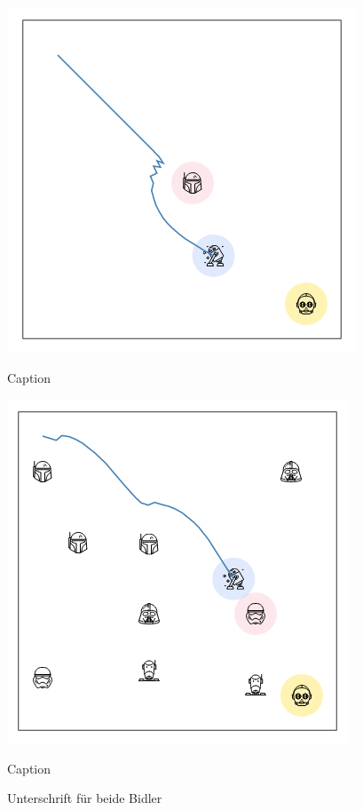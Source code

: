 \begin{figure}
\centering
\begin{minipage}[b]{.48\textwidth}
\centering
\includegraphics[width=0.8\linewidth, height=0.8\linewidth]{img/sim1.png}
\caption{Caption}\label{label-a}
\end{minipage}\hfill
\begin{minipage}[b]{.48\textwidth}
\centering
\includegraphics[width=0.8\linewidth, height=0.8\linewidth]{img/sim2.png}
\caption{Caption}\label{label-b}
\end{minipage}
\caption{Unterschrift für beide Bidler}
\end{figure}
